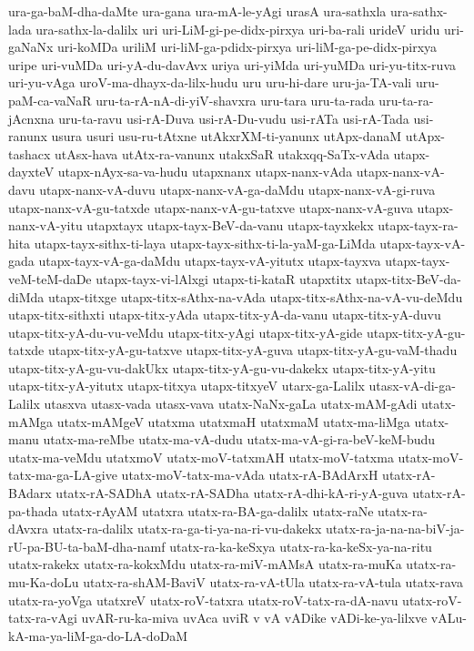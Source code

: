 {ura-ga-baM-dha-daMte
ura-gana
ura-mA-le-yAgi
urasA
ura-sathxla
ura-sathx-lada
ura-sathx-la-dalilx
uri
uri-LiM-gi-pe-didx-pirxya
uri-ba-rali
urideV
uridu
uri-gaNaNx
uri-koMDa
uriliM
uri-liM-ga-pdidx-pirxya
uri-liM-ga-pe-didx-pirxya
uripe
uri-vuMDa
uri-yA-du-davAvx
uriya
uri-yiMda
uri-yuMDa
uri-yu-titx-ruva
uri-yu-vAga
uroV-ma-dhayx-da-lilx-hudu
uru
uru-hi-dare
uru-ja-TA-vali
uru-paM-ca-vaNaR
uru-ta-rA-nA-di-yiV-shavxra
uru-tara
uru-ta-rada
uru-ta-ra-jAcnxna
uru-ta-ravu
usi-rA-Duva
usi-rA-Du-vudu
usi-rATa
usi-rA-Tada
usi-ranunx
usura
usuri
usu-ru-tAtxne
utAkxrXM-ti-yanunx
utApx-danaM
utApx-tashacx
utAsx-hava
utAtx-ra-vanunx
utakxSaR
utakxqq-SaTx-vAda
utapx-dayxteV
utapx-nAyx-sa-va-hudu
utapxnanx
utapx-nanx-vAda
utapx-nanx-vA-davu
utapx-nanx-vA-duvu
utapx-nanx-vA-ga-daMdu
utapx-nanx-vA-gi-ruva
utapx-nanx-vA-gu-tatxde
utapx-nanx-vA-gu-tatxve
utapx-nanx-vA-guva
utapx-nanx-vA-yitu
utapxtayx
utapx-tayx-BeV-da-vanu
utapx-tayxkekx
utapx-tayx-ra-hita
utapx-tayx-sithx-ti-laya
utapx-tayx-sithx-ti-la-yaM-ga-LiMda
utapx-tayx-vA-gada
utapx-tayx-vA-ga-daMdu
utapx-tayx-vA-yitutx
utapx-tayxva
utapx-tayx-veM-teM-daDe
utapx-tayx-vi-lAlxgi
utapx-ti-kataR
utapxtitx
utapx-titx-BeV-da-diMda
utapx-titxge
utapx-titx-sAthx-na-vAda
utapx-titx-sAthx-na-vA-vu-deMdu
utapx-titx-sithxti
utapx-titx-yAda
utapx-titx-yA-da-vanu
utapx-titx-yA-duvu
utapx-titx-yA-du-vu-veMdu
utapx-titx-yAgi
utapx-titx-yA-gide
utapx-titx-yA-gu-tatxde
utapx-titx-yA-gu-tatxve
utapx-titx-yA-guva
utapx-titx-yA-gu-vaM-thadu
utapx-titx-yA-gu-vu-dakUkx
utapx-titx-yA-gu-vu-dakekx
utapx-titx-yA-yitu
utapx-titx-yA-yitutx
utapx-titxya
utapx-titxyeV
utarx-ga-Lalilx
utasx-vA-di-ga-Lalilx
utasxva
utasx-vada
utasx-vava
utatx-NaNx-gaLa
utatx-mAM-gAdi
utatx-mAMga
utatx-mAMgeV
utatxma
utatxmaH
utatxmaM
utatx-ma-liMga
utatx-manu
utatx-ma-reMbe
utatx-ma-vA-dudu
utatx-ma-vA-gi-ra-beV-keM-budu
utatx-ma-veMdu
utatxmoV
utatx-moV-tatxmAH
utatx-moV-tatxma
utatx-moV-tatx-ma-ga-LA-give
utatx-moV-tatx-ma-vAda
utatx-rA-BAdArxH
utatx-rA-BAdarx
utatx-rA-SADhA
utatx-rA-SADha
utatx-rA-dhi-kA-ri-yA-guva
utatx-rA-pa-thada
utatx-rAyAM
utatxra
utatx-ra-BA-ga-dalilx
utatx-raNe
utatx-ra-dAvxra
utatx-ra-dalilx
utatx-ra-ga-ti-ya-na-ri-vu-dakekx
utatx-ra-ja-na-na-biV-ja-rU-pa-BU-ta-baM-dha-namf
utatx-ra-ka-keSxya
utatx-ra-ka-keSx-ya-na-ritu
utatx-rakekx
utatx-ra-kokxMdu
utatx-ra-miV-mAMsA
utatx-ra-muKa
utatx-ra-mu-Ka-doLu
utatx-ra-shAM-BaviV
utatx-ra-vA-tUla
utatx-ra-vA-tula
utatx-rava
utatx-ra-yoVga
utatxreV
utatx-roV-tatxra
utatx-roV-tatx-ra-dA-navu
utatx-roV-tatx-ra-vAgi
uvAR-ru-ka-miva
uvAca
uviR
v
vA
vADike
vADi-ke-ya-lilxve
vALu-kA-ma-ya-liM-ga-do-LA-doDaM
}
